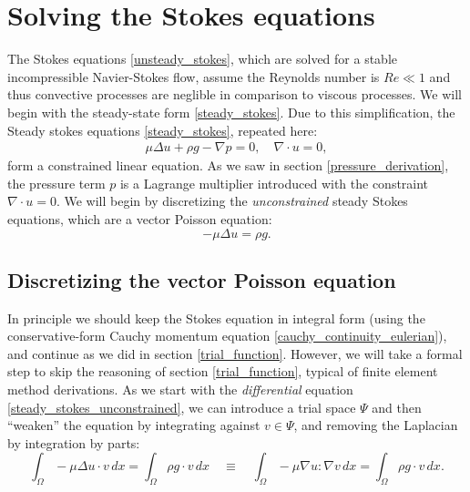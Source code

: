 \documentclass[11pt,a4paper]{memoir}
\begin{document}
\section{Solving the Stokes equations}
The Stokes equations \eqref{unsteady_stokes}, which are solved for a stable incompressible Navier-Stokes flow,
assume the Reynolds number is $Re \ll 1$ and thus convective processes are neglible in comparison to viscous processes.
We will begin with the steady-state form \eqref{steady_stokes}.
Due to this simplification, the Steady stokes equations \eqref{steady_stokes}, repeated here:
\begin{align*}
    \mu\Delta u + \rho g - \nabla p = 0,\quad \nabla\cdot u = 0,
\end{align*}
form a constrained linear equation. As we saw in section \ref{pressure_derivation}, the pressure term $p$ is a Lagrange multiplier introduced
with the constraint $\nabla\cdot u = 0$. We will begin by discretizing the \textit{unconstrained} steady Stokes equations,
which are a vector Poisson equation:
\begin{equation}\label{steady_stokes_unconstrained}
    -\mu\Delta u = \rho g.
\end{equation}

\subsection{Discretizing the vector Poisson equation}\label{discretizing_vector_poisson}
In principle we should keep the Stokes equation
in integral form (using the conservative-form Cauchy momentum equation \eqref{cauchy_continuity_eulerian}), and continue as we did
in section \ref{trial_function}. However,
we will take a formal step to skip the reasoning of section \ref{trial_function}, typical of finite element method derivations.
As we start with the \textit{differential} equation \eqref{steady_stokes_unconstrained}, we can introduce a trial space $\Psi$ and then ``weaken''
the equation by integrating against $v \in \Psi$, and removing the Laplacian by integration by parts:
\begin{equation}\label{steady_stokes_unconstrained_weak}
    \int_\Omega -\mu\Delta u\cdot v\,dx = \int_\Omega \rho g\cdot v\,dx
    \quad\equiv\quad
    \int_\Omega -\mu\nabla u : \nabla v\,dx = \int_\Omega \rho g\cdot v\,dx.
\end{equation}
\end{document}

